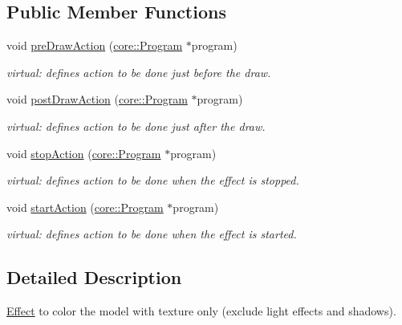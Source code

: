 \subsection*{Public Member Functions}
\begin{DoxyCompactItemize}
\item 
void \hyperlink{classfillwave_1_1effects_1_1TextureOnly_ada908a0505ac43646a6d2534f6189a66}{pre\+Draw\+Action} (\hyperlink{classfillwave_1_1core_1_1Program}{core\+::\+Program} $\ast$program)
\begin{DoxyCompactList}\small\item\em virtual\+: defines action to be done just before the draw. \end{DoxyCompactList}\item 
void \hyperlink{classfillwave_1_1effects_1_1TextureOnly_aaae24ae213873540c8fa55721d8e959f}{post\+Draw\+Action} (\hyperlink{classfillwave_1_1core_1_1Program}{core\+::\+Program} $\ast$program)
\begin{DoxyCompactList}\small\item\em virtual\+: defines action to be done just after the draw. \end{DoxyCompactList}\item 
void \hyperlink{classfillwave_1_1effects_1_1TextureOnly_a4875d2b3f3c00db020583648d93578ce}{stop\+Action} (\hyperlink{classfillwave_1_1core_1_1Program}{core\+::\+Program} $\ast$program)
\begin{DoxyCompactList}\small\item\em virtual\+: defines action to be done when the effect is stopped. \end{DoxyCompactList}\item 
void \hyperlink{classfillwave_1_1effects_1_1TextureOnly_ac81c1c8d8e91fb53bc21ab90fad8f4a7}{start\+Action} (\hyperlink{classfillwave_1_1core_1_1Program}{core\+::\+Program} $\ast$program)
\begin{DoxyCompactList}\small\item\em virtual\+: defines action to be done when the effect is started. \end{DoxyCompactList}\end{DoxyCompactItemize}


\subsection{Detailed Description}
\hyperlink{classfillwave_1_1effects_1_1Effect}{Effect} to color the model with texture only (exclude light effects and shadows). 


